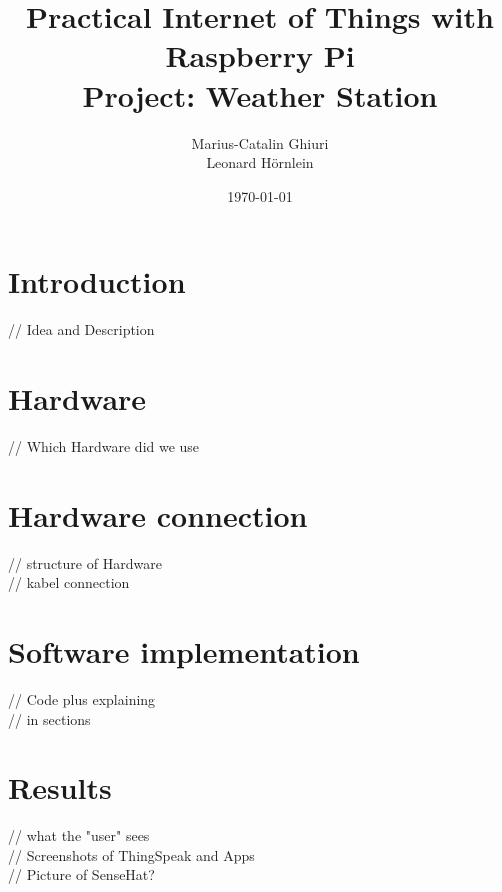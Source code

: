\documentclass[titlepage]{article}
\title{Practical Internet of Things with Raspberry Pi\\ Project: Weather Station}
\author{Marius-Catalin Ghiuri\\Leonard Hörnlein}
\date{\today}
\begin{document}
\maketitle
\newpage
\tableofcontents
\newpage

\section{Introduction}
// Idea and Description

\section{Hardware}
// Which Hardware did we use

\section{Hardware connection}
// structure of Hardware\\
// kabel connection

\section{Software implementation}
// Code plus explaining\\
// in sections

\section{Results}
// what the "user" sees\\
// Screenshots of ThingSpeak and Apps\\
// Picture of SenseHat?
\end{document}
